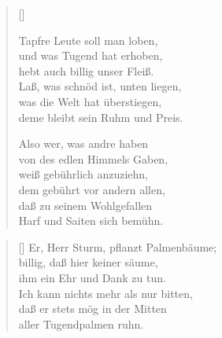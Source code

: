 \begin{multicols}{2}
\settowidth{\versewidth}{Er, Herr Sturm, pflanzt Palmenbäume;}
\begin{verse}[\versewidth]

 Tapfre Leute soll man loben,\\
und was Tugend hat erhoben,\\
hebt auch billig unser Fleiß.\\
Laß, was schnöd ist, unten liegen,\\
was die Welt hat überstiegen,\\
deme bleibt sein Ruhm und Preis.

 Also wer, was andre haben\\
von des edlen Himmels Gaben,\\
weiß gebührlich anzuziehn,\\
dem gebührt vor andern allen,\\
daß zu seinem Wohlgefallen\\
Harf und Saiten sich bemühn.
\end{verse}
\end{multicols}

\begin{center}
\settowidth{\versewidth}{Er, Herr Sturm, pflanzt Palmenbäume;}
\begin{verse}[\versewidth]  
 Er, Herr Sturm, pflanzt Palmenbäume;\\
billig, daß hier keiner säume,\\
ihm ein Ehr und Dank zu tun.\\
Ich kann nichts mehr als nur bitten,\\
daß er stets mög in der Mitten\\
aller Tugendpalmen ruhn.
   
\end{verse}
\end{center}
